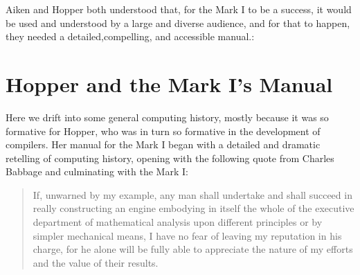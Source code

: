 Aiken and Hopper both understood that, for the Mark I to be a success, it would be used
and understood by a large and diverse audience, and for that to happen, they
needed a detailed,compelling, and accessible
manual.\cite{annals_of_the_computation_laboratory_of_harvard_university_1946}:


\section{Hopper and the Mark I's Manual}

Here we drift into some general computing history,
mostly because it was so formative for Hopper, who was in turn so
formative in the development of compilers.
Her manual for the Mark I
began with a detailed and dramatic retelling of computing history,
opening with the following quote from Charles Babbage
and culminating with the Mark I:

\begin{quotation}
  If, unwarned by my example, any man shall undertake
  and shall succeed in really constructing an engine embodying in
  itself the whole of the executive department of mathematical
  analysis upon different principles or by simpler mechanical means, I
  have no fear of leaving my reputation in his charge, for he alone
  will be fully able to appreciate the nature of my efforts and the
  value of their results.
\end{quotation}

